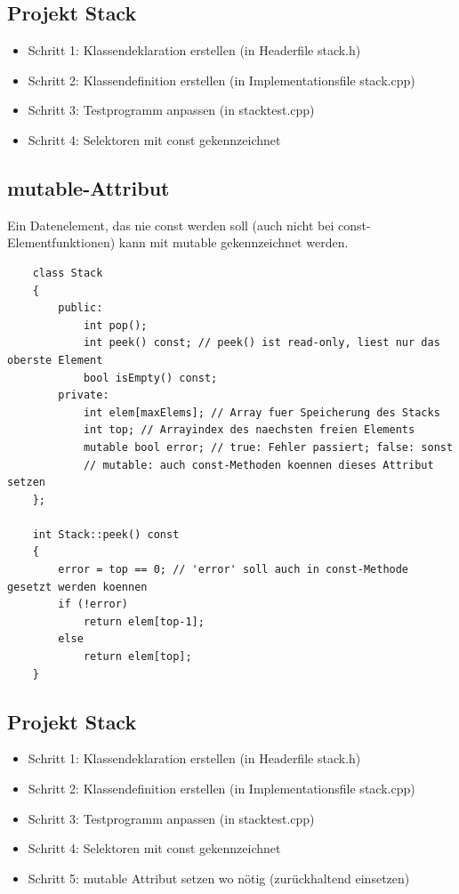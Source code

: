 \subsection{Projekt Stack}
\label{sec:Projekt Stack 2}
\begin{itemize}
	\item Schritt 1: Klassendeklaration erstellen (in Headerfile stack.h)
	\item Schritt 2: Klassendefinition erstellen (in Implementationsfile stack.cpp)
	\item Schritt 3: Testprogramm anpassen (in stacktest.cpp)
	\item Schritt 4: Selektoren mit const gekennzeichnet
\end{itemize}

\subsection{mutable-Attribut}
\label{sec:mutable-Attribut}
Ein Datenelement, das nie const werden soll (auch nicht bei const-Elementfunktionen) kann mit mutable gekennzeichnet werden.
\noindent
\begin{minipage}{\linewidth}
	\begin{lstlisting}
	class Stack
	{
		public:
			int pop();
			int peek() const; // peek() ist read-only, liest nur das oberste Element
			bool isEmpty() const;
		private:
			int elem[maxElems]; // Array fuer Speicherung des Stacks
			int top; // Arrayindex des naechsten freien Elements
			mutable bool error; // true: Fehler passiert; false: sonst
			// mutable: auch const-Methoden koennen dieses Attribut setzen
	};
	
	int Stack::peek() const
	{
		error = top == 0; // 'error' soll auch in const-Methode gesetzt werden koennen
		if (!error)
			return elem[top-1];
		else
			return elem[top];
	}
	\end{lstlisting}
\end{minipage}

\subsection{Projekt Stack}
\label{sec:Projekt Stack 3}
\begin{itemize}
	\item Schritt 1: Klassendeklaration erstellen (in Headerfile stack.h)
	\item Schritt 2: Klassendefinition erstellen (in Implementationsfile stack.cpp)
	\item Schritt 3: Testprogramm anpassen (in stacktest.cpp)
	\item Schritt 4: Selektoren mit const gekennzeichnet
	\item Schritt 5: mutable Attribut setzen wo nötig (zurückhaltend einsetzen)
\end{itemize}


